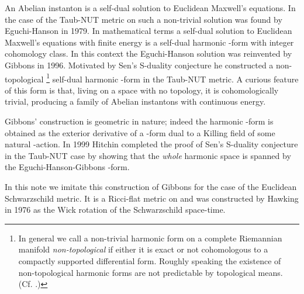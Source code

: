 \documentclass[a4paper,12pt,draft]{article}
\begin{document}
An Abelian instanton is a self-dual solution to Euclidean Maxwell's
equations. In the case of the Taub-NUT metric on \coordHE{}
such a non-trivial solution was found by Eguchi-Hanson \cite{eguchi-hanson}
in 1979. In mathematical terms a self-dual solution to Euclidean Maxwell's
equations with finite energy is a self-dual \coordHE{} harmonic \coordHE{}-form with
integer cohomology class. In this context the 
Eguchi-Hanson solution was reinvented by Gibbons \cite{gibbons} in 1996. 
Motivated by Sen's S-duality conjecture he constructed a non-topological
\footnote{\label{footnote} In general we call a non-trivial 
\coordHE{} harmonic form on a complete Riemannian 
manifold {\em non-topological} if either it is exact or 
not cohomologous to a compactly
supported differential form. Roughly speaking the existence of 
non-topological \coordHE{} harmonic forms are not predictable by topological 
means. (Cf. \cite{segal-selby}.)} self-dual \coordHE{} harmonic 
\coordHE{}-form in the Taub-NUT metric. A curious feature of this form is that, 
living on a space with no topology, it is
cohomologically trivial, producing a family of Abelian instantons with 
continuous energy. 

Gibbons' construction is geometric in nature; indeed the \coordHE{} harmonic 
\coordHE{}-form is obtained 
as the exterior derivative of a \coordHE{}-form dual to a Killing field of some 
natural \coordHE{}-action. In 1999 Hitchin \cite{hitchin} 
completed the proof of Sen's 
S-duality conjecture in the Taub-NUT case by showing that the {\em whole} 
\coordHE{} harmonic space is spanned by the Eguchi-Hanson-Gibbons \coordHE{}-form. 

In this note we imitate this construction of Gibbons for the case of the 
Euclidean Schwarzschild metric. It is a Ricci-flat metric on \coordHE{} \cite{wald} and was constructed by Hawking \cite{hawking} in 1976 as 
the Wick rotation  of the Schwarzschild space-time. 
\end{document}
